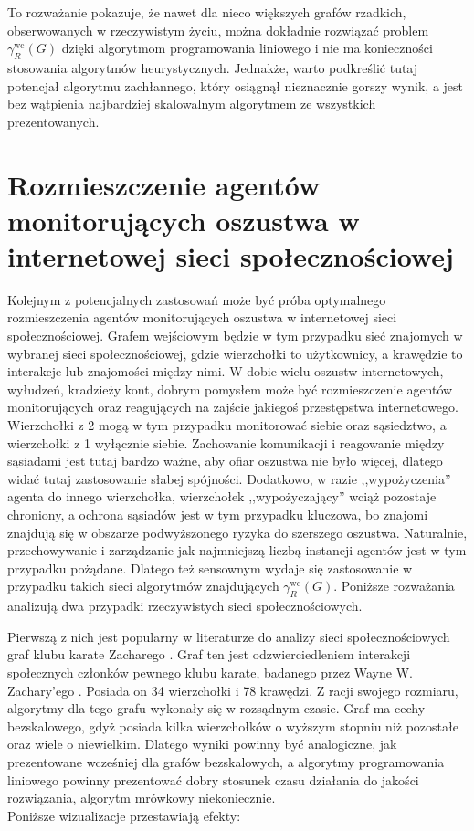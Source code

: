 To rozważanie pokazuje, że nawet dla nieco większych grafów rzadkich, obserwowanych w rzeczywistym życiu, można dokładnie rozwiązać problem $\gamma^{\text{wc}}_R(G)$ dzięki algorytmom programowania liniowego i nie ma konieczności stosowania algorytmów heurystycznych. Jednakże, warto podkreślić tutaj potencjał algorytmu zachłannego, który osiągnął nieznacznie gorszy wynik, a jest bez wątpienia najbardziej skalowalnym algorytmem ze wszystkich prezentowanych.

\section{Rozmieszczenie agentów monitorujących oszustwa w internetowej sieci społecznościowej}

Kolejnym z potencjalnych zastosowań może być próba optymalnego rozmieszczenia agentów monitorujących oszustwa w internetowej sieci społecznościowej. Grafem wejściowym będzie w tym przypadku sieć znajomych w wybranej sieci społecznościowej, gdzie wierzchołki to użytkownicy, a krawędzie to interakcje lub znajomości między nimi. W dobie wielu oszustw internetowych, wyłudzeń, kradzieży kont, dobrym pomysłem może być rozmieszczenie agentów monitorujących oraz reagujących na zajście jakiegoś przestępstwa internetowego. Wierzchołki z 2 mogą w tym przypadku monitorować siebie oraz sąsiedztwo, a wierzchołki z 1 wyłącznie siebie. Zachowanie komunikacji i reagowanie między sąsiadami jest tutaj bardzo ważne, aby ofiar oszustwa nie było więcej, dlatego widać tutaj zastosowanie słabej spójności. Dodatkowo, w razie ,,wypożyczenia'' agenta do innego wierzchołka, wierzchołek ,,wypożyczający'' wciąż pozostaje chroniony, a ochrona sąsiadów jest w tym przypadku kluczowa, bo znajomi znajdują się w obszarze podwyższonego ryzyka do szerszego oszustwa. Naturalnie, przechowywanie i zarządzanie jak najmniejszą liczbą instancji agentów jest w tym przypadku pożądane. Dlatego też sensownym wydaje się zastosowanie w przypadku takich sieci algorytmów znajdujących $\gamma^{\text{wc}}_R(G)$. Poniższe rozważania analizują dwa przypadki rzeczywistych sieci społecznościowych.

 Pierwszą z nich jest popularny w literaturze do analizy sieci społecznościowych graf klubu karate Zacharego \cite{KARATE}. Graf ten jest odzwierciedleniem interakcji społecznych członków pewnego klubu karate, badanego przez Wayne W. Zachary'ego \cite{ZACHARY}. Posiada on 34 wierzchołki i 78 krawędzi. Z racji swojego rozmiaru, algorytmy dla tego grafu wykonały się w rozsądnym czasie. Graf ma cechy bezskalowego, gdyż posiada kilka wierzchołków o wyższym stopniu niż pozostałe oraz wiele o niewielkim. Dlatego wyniki powinny być analogiczne, jak prezentowane wcześniej dla grafów bezskalowych, a algorytmy programowania liniowego powinny prezentować dobry stosunek czasu działania do jakości rozwiązania, algorytm mrówkowy niekoniecznie. \\
 Poniższe wizualizacje przestawiają efekty:

